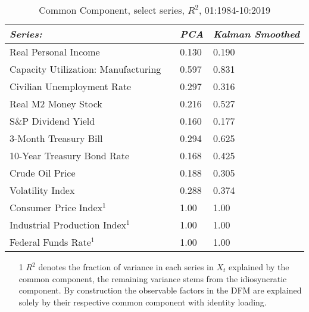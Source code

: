 \begin{table}[H]
    \centering
    \caption{Common Component, select series, $R^2$, 01:1984-10:2019}
\begin{tabular}{llll}
\toprule
\textit{Series:} && \textit{PCA} & \textit{Kalman Smoothed} \\
\midrule
Real Personal Income && 0.130 & 0.190 \\
Capacity Utilization: Manufacturing && 0.597 & 0.831 \\
Civilian Unemployment Rate && 0.297 & 0.316 \\
Real M2 Money Stock && 0.216 & 0.527 \\
S\&P Dividend Yield && 0.160 & 0.177 \\
3-Month Treasury Bill && 0.294 & 0.625 \\
10-Year Treasury Bond Rate && 0.168 & 0.425 \\
Crude Oil Price && 0.188 & 0.305 \\
Volatility Index && 0.288 & 0.374 \\
Consumer Price Index$^1$ && 1.00 & 1.00 \\
Industrial Production Index$^1$ && 1.00 & 1.00 \\
Federal Funds Rate$^1$ && 1.00 & 1.00 \\
\bottomrule
\end{tabular}
\begin{minipage}{0.88\textwidth}
{\footnotesize
    \begin{enumerate}
        \item[] {}
        \item[1] $R^2$ denotes the fraction of variance in each series in $X_t$ explained by the common component, the remaining variance stems from the idiosyncratic component. By construction the observable factors in the DFM are explained solely by their respective common component with identity loading.
    \end{enumerate}}
    \end{minipage}
    \label{tab:R2sPostVolcker}
\end{table}
